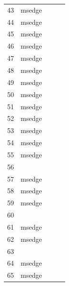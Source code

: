 \documentclass[a4paper,twoside,12pt]{book}
\begin{document}
\begin{appendices}
\begin{table}
\begin{tabular}{lllll}
	43  &         msedge &                &                &                \\
	44  &         msedge &                &                &                \\
	45  &         msedge &                &                &                \\
	46  &         msedge &                &                &                \\
	47  &         msedge &                &                &                \\
	48  &         msedge &                &                &                \\
	49  &         msedge &                &                &                \\
	50  &         msedge &                &                &                \\
	51  &         msedge &                &                &                \\
	52  &         msedge &                &                &                \\
	53  &         msedge &                &                &                \\
	54  &         msedge &                &                &                \\
	55  &         msedge &                &                &                \\
	56  &                &                &                &                \\
	57  &         msedge &                &                &                \\
	58  &         msedge &                &                &                \\
	59  &         msedge &                &                &                \\
	60  &                &                &                &                \\
	61  &         msedge &                &                &                \\
	62  &         msedge &                &                &                \\
	63  &                &                &                &                \\
	64  &         msedge &                &                &                \\
	65  &         msedge &                &                &                \\

\end{tabular}
\end{table}
\end{appendices}
\end{document}
